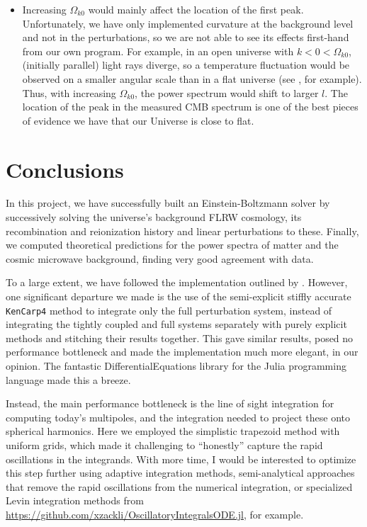\documentclass[10pt,a4paper]{article}
\begin{document}
\begin{itemize}
\item
Increasing $\Omega_{k0}$ would mainly affect the location of the first peak.
Unfortunately, we have only implemented curvature at the background level and not in the perturbations,
so we are not able to see its effects first-hand from our own program.
For example, in an open universe with $k < 0 < \Omega_{k0}$,
(initially parallel) light rays diverge,
so a temperature fluctuation would be observed on a smaller angular scale
than in a flat universe (see \cite[figure 9.14]{dodelsonModernCosmology2021}, for example).
Thus, with increasing $\Omega_{k0}$,
the power spectrum would shift to larger $l$.
The location of the peak in the measured CMB spectrum
is one of the best pieces of evidence we have
that our Universe is close to flat.
\end{itemize}

\clearpage
\section{Conclusions}

In this project,
we have successfully built an Einstein-Boltzmann solver by successively solving the universe's
background FLRW cosmology, its recombination and reionization history and linear perturbations to these.
Finally, we computed theoretical predictions for the power spectra of matter and the cosmic microwave background,
finding very good agreement with data.

To a large extent, we have followed the implementation outlined by \cite{callinHowCalculateCMB2006,wintherCosmologyIINumerical}.
However, one significant departure we made
is the use of the semi-explicit stiffly accurate \texttt{KenCarp4} method to integrate only the full perturbation system,
instead of integrating the tightly coupled and full systems separately with purely explicit methods and stitching their results together.
This gave similar results, posed no performance bottleneck and made the implementation much more elegant, in our opinion.
The fantastic DifferentialEquations library for the Julia programming language made this a breeze.

Instead, the main performance bottleneck is the
line of sight integration for computing today's multipoles,
and the integration needed to project these onto spherical harmonics.
Here we employed the simplistic trapezoid method with uniform grids,
which made it challenging to ``honestly'' capture the rapid oscillations in the integrands.
With more time, I would be interested to optimize this step further using
adaptive integration methods,
semi-analytical approaches that remove the rapid oscillations from the numerical integration,
or specialized Levin integration methods from \href{https://github.com/xzackli/OscillatoryIntegralsODE.jl}{https://github.com/xzackli/OscillatoryIntegralsODE.jl}, for example.
\end{document}
